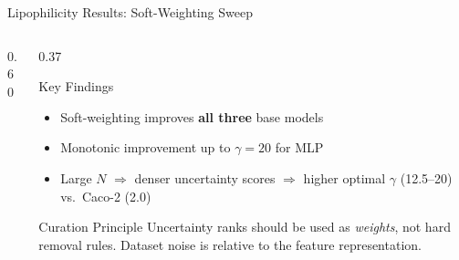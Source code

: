 \documentclass[aspectratio=169]{beamer}
\begin{document}
\begin{frame}[t,shrink=15]{Lipophilicity Results: Soft-Weighting Sweep}
\begin{columns}[T]
\begin{column}{0.60\textwidth}
\end{column}
\begin{column}{0.37\textwidth}
\begin{alertblock}{Key Findings}
\footnotesize
\begin{itemize}
  \item Soft-weighting improves \textbf{all three} base models
  \item Monotonic improvement up to $\gamma{=}20$ for MLP
  \item Large $N$ $\Rightarrow$ denser uncertainty scores $\Rightarrow$ higher optimal $\gamma$ (12.5--20) vs.\ Caco-2 (2.0)
\end{itemize}
\end{alertblock}
\vspace{4pt}
\begin{block}{Curation Principle}
\footnotesize Uncertainty ranks should be used as \emph{weights}, not hard removal rules. Dataset noise is relative to the feature representation.
\end{block}
\end{column}
\end{columns}
\end{frame}
\end{document}
